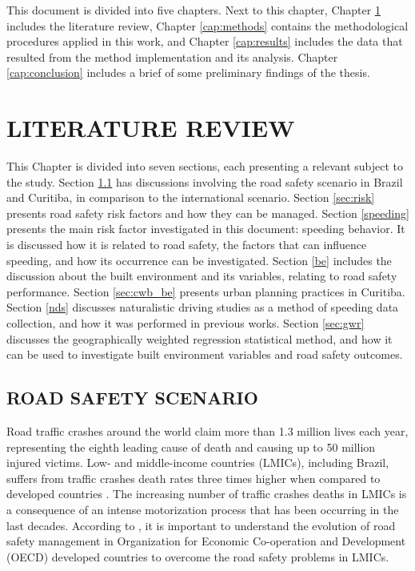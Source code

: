 This document is divided into five chapters. Next to this chapter, Chapter \ref{cap:lr} includes the literature review, Chapter \ref{cap:methods} contains the methodological procedures applied in this work, and Chapter \ref{cap:results} includes the data that resulted from the method implementation and its analysis. Chapter \ref{cap:conclusion} includes a brief of some preliminary findings of the thesis. 


\chapter{LITERATURE REVIEW} \label{cap:lr}

This Chapter is divided into seven sections, each presenting a relevant subject to the study. Section \ref{sec:rss} has discussions involving the road safety scenario in Brazil and Curitiba, in comparison to the international scenario. Section \ref{sec:risk} presents road safety risk factors and how they can be managed. Section \ref{speeding} presents the main risk factor investigated in this document: speeding behavior. It is discussed how it is related to road safety, the factors that can influence speeding, and how its occurrence can be investigated. Section \ref{be} includes the discussion about the built environment and its variables, relating to road safety performance. Section \ref{sec:cwb_be} presents urban planning practices in Curitiba. Section \ref{nds} discusses naturalistic driving studies as a method of speeding data collection, and how it was performed in previous works. Section \ref{sec:gwr} discusses the geographically weighted regression statistical method, and how it can be used to investigate built environment variables and road safety outcomes.

\section{ROAD SAFETY SCENARIO} \label{sec:rss}

Road traffic crashes around the world claim more than 1.3 million lives each year, representing the eighth leading cause of death and causing up to 50 million injured victims. Low- and middle-income countries (LMICs), including Brazil, suffers from traffic crashes death rates three times higher when compared to developed countries \cite{WHO2018}. The increasing number of traffic crashes deaths in LMICs is a consequence of an intense motorization process that has been occurring in the last decades. According to \textcite{Bhalla2016}, it is important to understand the evolution of road safety management in Organization for Economic Co-operation and Development (OECD) developed countries to overcome the road safety problems in LMICs. 

